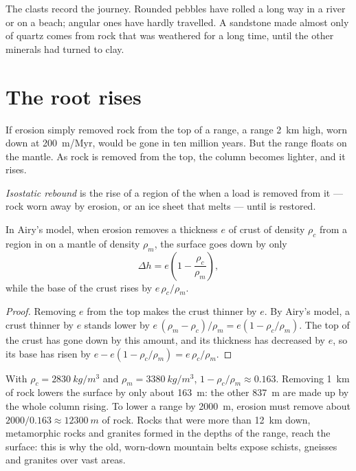 The clasts record the journey. Rounded pebbles have rolled a long way in a
river or on a beach; angular ones have hardly travelled. A sandstone made
almost only of quartz comes from rock that was weathered for a long time,
until the other minerals had turned to clay.

\section{The root rises}

If erosion simply removed rock from the top of a range, a range \qty{2}{km}
high, worn down at \qty{200}{m/Myr}, would be gone in ten million years.
But the range floats on the mantle. As rock is removed from the top, the
column becomes lighter, and it rises.

\begin{definition}\label{def:g12:destruction-of-mountains:rebound}
\emph{Isostatic rebound} is the rise of a region of
the  when a load is removed from it --- rock worn away by erosion,
or an ice sheet that melts --- until  is restored.
\end{definition}

\begin{proposition}\label{prop:g12:destruction-of-mountains:rebound}
In Airy's model, when erosion removes a thickness $e$ of crust of density
$\rho_c$ from a region in  on a mantle of density $\rho_m$, the
surface goes down by only
\[
  \Delta h = e\left(1 - \frac{\rho_c}{\rho_m}\right),
\]
while the base of the crust rises by $e\,\rho_c/\rho_m$.
\end{proposition}

\begin{proof}
Removing $e$ from the top makes the crust thinner by $e$. By Airy's model,
a crust thinner by $e$ stands lower by $e\,(\rho_m - \rho_c)/\rho_m = e(1 -
\rho_c/\rho_m)$. The top of the crust has gone down by this amount, and its
thickness has decreased by $e$, so its base has risen by $e - e(1 -
\rho_c/\rho_m) = e\,\rho_c/\rho_m$.
\end{proof}

With $\rho_c = \qty{2830}{kg/m^3}$ and $\rho_m = \qty{3380}{kg/m^3}$, $1 -
\rho_c/\rho_m \approx 0.163$. Removing \qty{1}{km} of rock lowers the
surface by only about \qty{163}{m}: the other \qty{837}{m} are made up by the
whole column rising. To lower a range by \qty{2000}{m}, erosion must remove
about $2000/0.163 \approx \qty{12300}{m}$ of rock. Rocks that were more than
\qty{12}{km} down, metamorphic rocks and granites formed in the depths of the
range, reach the surface: this is why the old, worn-down mountain belts
expose schists, gneisses and granites over vast areas.

